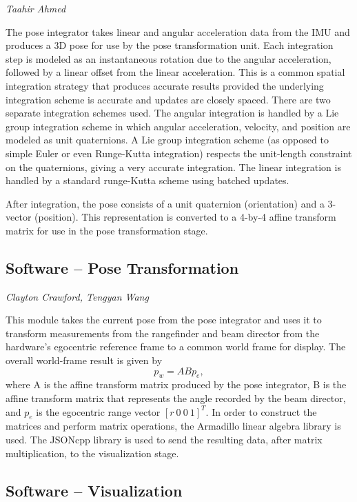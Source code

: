 \documentclass[twocolumn]{article}
\begin{document}
\emph{Taahir Ahmed}

The pose integrator takes linear and angular acceleration data from the IMU and
produces a 3D pose for use by the pose transformation unit.  Each integration
step is modeled as an instantaneous rotation due to the angular acceleration,
followed by a linear offset from the linear acceleration.  This is a common
spatial integration strategy that produces accurate results provided the
underlying integration scheme is accurate and updates are closely spaced.  There
are two separate integration schemes used. The angular integration is handled by
a Lie group integration scheme in which angular acceleration, velocity, and
position are modeled as unit quaternions.  A Lie group integration scheme (as
opposed to simple Euler or even Runge-Kutta integration) respects the
unit-length constraint on the quaternions, giving a very accurate integration.
The linear integration is handled by a standard runge-Kutta scheme using batched
updates.

After integration, the pose consists of a unit quaternion (orientation) and a
3-vector (position).  This representation is converted to a 4-by-4 affine
transform matrix for use in the pose transformation stage.

\subsection{Software -- Pose Transformation}

\emph{Clayton Crawford, Tengyan Wang}

This module takes the current pose from the pose integrator and uses it to
transform measurements from the rangefinder and beam director from the
hardware's egocentric reference frame to a common world frame for display.  The
overall world-frame result is given by
\begin{equation}
  p_w = A B p_e,
\end{equation}
where A is the affine transform matrix produced by the pose integrator, B is the
affine transform matrix that represents the angle recorded by the beam director,
and $p_e$ is the egocentric range vector $[r\ 0\ 0\ 1]^T$.  In order to construct
the matrices and perform matrix operations, the Armadillo linear algebra library
is used. The JSONcpp library is used to send the resulting data, after matrix
multiplication, to the visualization stage.

\subsection{Software -- Visualization}
\end{document}
